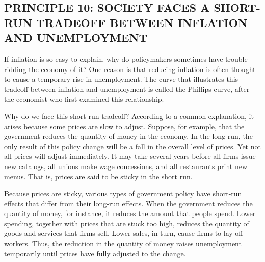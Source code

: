 \subsection*{PRINCIPLE 10: SOCIETY FACES A SHORT-RUN TRADEOFF BETWEEN INFLATION AND UNEMPLOYMENT}

If inflation is so easy to explain, why do policymakers sometimes have trouble ridding the economy of it?
One reason is that reducing inflation is often thought to cause a temporary rise in unemployment.
The curve that illustrates this tradeoff between inflation and unemployment is called the Phillips curve, after the economist who first examined this relationship.


Why do we face this short-run tradeoff?
According to a common explanation, it arises because some prices are slow to adjust.
Suppose, for example, that the government reduces the quantity of money in the economy.
In the long run, the only result of this policy change will be a fall in the overall level of prices.
Yet not all prices will adjust immediately.
It may take several years before all firms issue new catalogs, all unions make wage concessions, and all restaurants print new menus.
That is, prices are said to be sticky in the short run.


Because prices are sticky, various types of government policy have short-run effects that differ from their long-run effects.
When the government reduces the quantity of money, for instance, it reduces the amount that people spend.
Lower spending, together with prices that are stuck too high, reduces the quantity of goods and services that firms sell.
Lower sales, in turn, cause firms to lay off workers.
Thus, the reduction in the quantity of money raises unemployment temporarily until prices have fully adjusted to the change.



